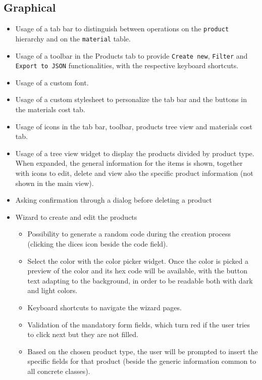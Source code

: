 \documentclass[10pt]{article}
\begin{document}
\subsection{Graphical}
\begin{itemize}
    \item Usage of a tab bar to distinguish between operations on the \texttt{product}
          hierarchy and on the \texttt{material} table.
    \item Usage of a toolbar in the Products tab to provide \texttt{Create new},
          \texttt{Filter} and \texttt{Export to JSON} functionalities, with the
          respective keyboard shortcuts.
    \item Usage of a custom font.
    \item Usage of a custom stylesheet to personalize the tab bar and the buttons in the
          materials cost tab.
    \item Usage of icons in the tab bar, toolbar, products tree view and materials cost
          tab.
    \item Usage of a tree view widget to display the products divided by product type.
          When expanded, the general information for the items is shown, together with
          icons to edit, delete and view also the specific product information (not shown
          in the main view).
    \item Asking confirmation through a dialog before deleting a product
    \item Wizard to create and edit the products
          \begin{itemize}
              \item Possibility to generate a random code during the creation process (clicking the
                    dices icon beside the code field).
              \item Select the color with the color picker widget. Once the color is picked a
                    preview of the color and its hex code will be available, with the button text
                    adapting to the background, in order to be readable both with dark and light
                    colors.
              \item Keyboard shortcuts to navigate the wizard pages.
              \item Validation of the mandatory form fields, which turn red if the user tries to
                    click next but they are not filled.
              \item Based on the chosen product type, the user will be prompted to insert the
                    specific fields for that product (beside the generic information common to all
                    concrete classes).
          \end{itemize}

\end{itemize}
\newpage
\end{document}
